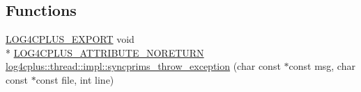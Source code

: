 \subsection*{Functions}
\begin{DoxyCompactItemize}
\item 
\hyperlink{config_8hxx_ab13cb1a5317c245ee2ef4f2bfe0cfb2d}{L\-O\-G4\-C\-P\-L\-U\-S\-\_\-\-E\-X\-P\-O\-R\-T} void \\*
\hyperlink{config_8hxx_a9e2009a9383c0007ef30ca204ad8b3e3}{L\-O\-G4\-C\-P\-L\-U\-S\-\_\-\-A\-T\-T\-R\-I\-B\-U\-T\-E\-\_\-\-N\-O\-R\-E\-T\-U\-R\-N} \hyperlink{namespacelog4cplus_1_1thread_1_1impl_ae8a0c65e304c0b6f4517d161a3fefc4c}{log4cplus\-::thread\-::impl\-::syncprims\-\_\-throw\-\_\-exception} (char const $\ast$const msg, char const $\ast$const file, int line)
\end{DoxyCompactItemize}
